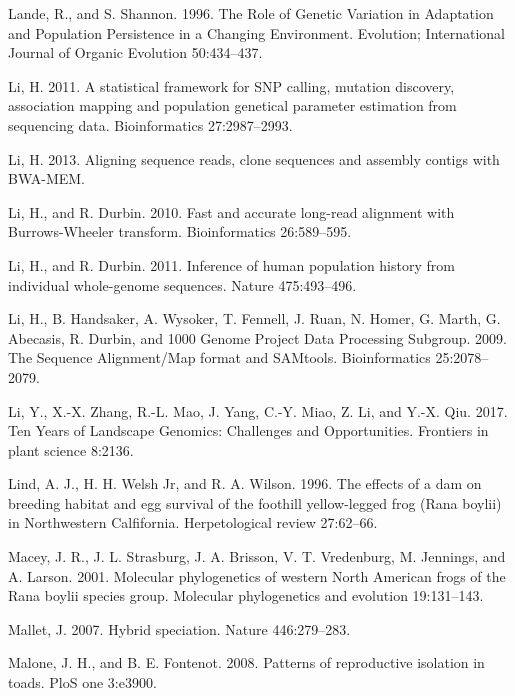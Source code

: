 \documentclass[proquest,12pt,final]{ucthesis-CA2012} %
\begin{document}
\begin{ucmainmatter}
\leavevmode\hypertarget{ref-lande_role_1996}{}%
Lande, R., and S. Shannon. 1996. The Role of Genetic Variation in
Adaptation and Population Persistence in a Changing Environment.
Evolution; International Journal of Organic Evolution 50:434--437.

\leavevmode\hypertarget{ref-li_statistical_2011}{}%
Li, H. 2011. A statistical framework for SNP calling, mutation
discovery, association mapping and population genetical parameter
estimation from sequencing data. Bioinformatics 27:2987--2993.

\leavevmode\hypertarget{ref-li_aligning_2013}{}%
Li, H. 2013. Aligning sequence reads, clone sequences and assembly
contigs with BWA-MEM.

\leavevmode\hypertarget{ref-li_fast_2010}{}%
Li, H., and R. Durbin. 2010. Fast and accurate long-read alignment with
Burrows-Wheeler transform. Bioinformatics 26:589--595.

\leavevmode\hypertarget{ref-li_inference_2011}{}%
Li, H., and R. Durbin. 2011. Inference of human population history from
individual whole-genome sequences. Nature 475:493--496.

\leavevmode\hypertarget{ref-li_sequence_2009}{}%
Li, H., B. Handsaker, A. Wysoker, T. Fennell, J. Ruan, N. Homer, G.
Marth, G. Abecasis, R. Durbin, and 1000 Genome Project Data Processing
Subgroup. 2009. The Sequence Alignment/Map format and SAMtools.
Bioinformatics 25:2078--2079.

\leavevmode\hypertarget{ref-li_ten_2017}{}%
Li, Y., X.-X. Zhang, R.-L. Mao, J. Yang, C.-Y. Miao, Z. Li, and Y.-X.
Qiu. 2017. Ten Years of Landscape Genomics: Challenges and
Opportunities. Frontiers in plant science 8:2136.

\leavevmode\hypertarget{ref-lind_effects_1996}{}%
Lind, A. J., H. H. Welsh Jr, and R. A. Wilson. 1996. The effects of a
dam on breeding habitat and egg survival of the foothill yellow-legged
frog (Rana boylii) in Northwestern Calfifornia. Herpetological review
27:62--66.

\leavevmode\hypertarget{ref-macey_molecular_2001}{}%
Macey, J. R., J. L. Strasburg, J. A. Brisson, V. T. Vredenburg, M.
Jennings, and A. Larson. 2001. Molecular phylogenetics of western North
American frogs of the Rana boylii species group. Molecular phylogenetics
and evolution 19:131--143.

\leavevmode\hypertarget{ref-mallet_hybrid_2007}{}%
Mallet, J. 2007. Hybrid speciation. Nature 446:279--283.

\leavevmode\hypertarget{ref-malone_patterns_2008}{}%
Malone, J. H., and B. E. Fontenot. 2008. Patterns of reproductive
isolation in toads. PloS one 3:e3900.


\end{ucmainmatter}
\end{document}
